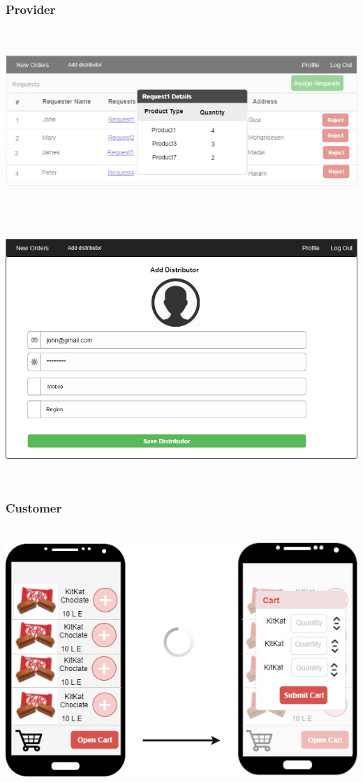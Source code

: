 \documentclass[12pt]{article}
\begin{document}
\subsubsection{ Provider }
\includegraphics[width=16.5cm,height=7cm]{./assets/prototype/provider-1.png}\\
\includegraphics[width=16.5cm,height=10cm]{./assets/prototype/provider-2.png}\\

\subsubsection{ Customer }
\includegraphics[width=16cm,height=10cm]{./assets/prototype/customer-1.png}\\
\end{document}
